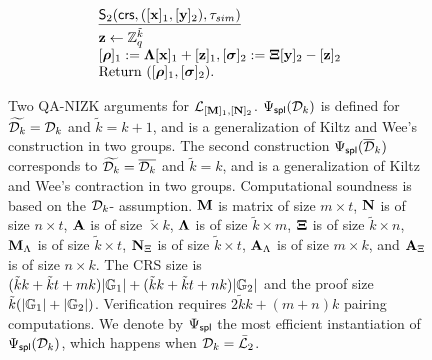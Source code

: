 \begin{figure}
$$\begin{array}{l}
\\
\begin{array}{l}
    \underline{\mathsf{S}_2(\mathsf{crs},([\mathbf{x}]_1,[\mathbf{y}]_2),\tau_{sim})}\\[.1cm]
    \mathbf{z} \gets \mathbb{Z}_q^{\tilde{k}} \\ 
    {[{\boldsymbol \rho}]_1:=\mathbf{{\Lambda}} [\mathbf{x}]_1+ [\mathbf{z}]_1},{[{\boldsymbol \sigma}]_2:=\mathbf{{\Xi}} [\mathbf{y}]_2- [\mathbf{z}]_2}\\
    {\text{Return }  ([{\boldsymbol \rho}]_1,[{\boldsymbol \sigma}]_2).}
\end{array}
\\
\end{array}
$$
\caption{Two QA-NIZK arguments for  $\mathcal{L}_{[\mathbf{{M}}]_1,[\mathbf{{N}}]_2}$. ${\Psi_{\mathsf{spl}}(\mathcal{D}_k)}$ is 
 defined for $\widetilde{\mathcal{D}_{k}}=\mathcal{D}_k$ and $\tilde{k}=k+1$, and is a generalization of Kiltz and Wee's construction \cite[Section~3.1]{EC:KilWee15}  in two groups. The second construction ${\Psi_\mathsf{spl}(\overline{\mathcal{D}}_k)}$ corresponds to $\widetilde{\mathcal{D}_{k}}=\overline{\mathcal{D}_k}$ and $\tilde{k}=k$, and is a generalization of Kiltz and Wee's contraction \cite[Section~3.2]{EC:KilWee15} in two groups. Computational soundness is based on the $\mathcal{D}_{k}$-\skermdh{} assumption. 
$\mathbf{{M}}$ is matrix of size $m\times t$, $\mathbf{{N}}$ is of size $n\times t$, $\mathbf{{A}}$ is of size $\tilde \times k$, $\mathbf{{\Lambda}}$ is of size $\tilde{k}\times m$, $\mathbf{{\Xi}}$ is of size $\tilde{k}\times n$, $\mathbf{{M}}_\Lambda$ is of size $\tilde{k}\times t$, $\mathbf{{N}}_\Xi$ is of size $\tilde{k}\times t$, $\mathbf{{A}}_\Lambda$ is of size $m\times k$, and $\mathbf{{A}}_\Xi$ is of size $n\times k$.
The CRS size is $(\tilde{k}k+\tilde{k}t+mk)|\mathbb{G}_1|+(\tilde{k}k+\tilde{k}t+nk)|\mathbb{G}_2|$ and the proof size $\tilde{k}(|\mathbb{G}_1|+|\mathbb{G}_2|)$. Verification requires $2\tilde{k}k+(m+n)k$ pairing computations. We denote by $\Psi_{\mathsf{spl}}$ the most efficient instantiation of ${\Psi_{\mathsf{spl}}(\mathcal{D}_k)}$, which happens when $\mathcal{D}_k=\bar{\mathcal{L}}_2$. \label{fig:QANIZKtwogroups} }
\end{figure}

